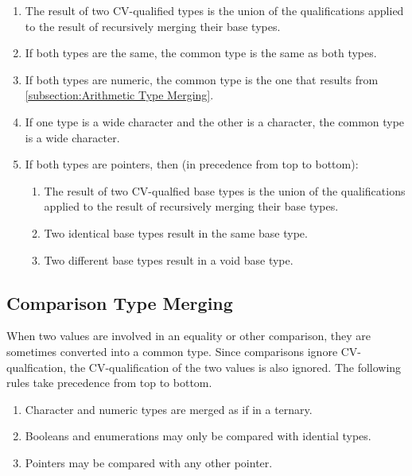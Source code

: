 \documentclass[letterpaper,12pt]{book}
\begin{document}
\begin{enumerate}
	\item The result of two CV-qualified types is the union of the qualifications applied to the result of recursively merging their base types.
	
	\item If both types are the same, the common type is the same as both types.
	
	\item If both types are numeric, the common type is the one that results from \ref{subsection:Arithmetic Type Merging}.
	
	\item If one type is a wide character and the other is a character, the common type is a wide character.
	
	\item If both types are pointers, then (in precedence from top to bottom):
	\begin{enumerate}
		\item The result of two CV-qualfied base types is the union of the qualifications applied to the result of recursively merging their base types.
		
		\item Two identical base types result in the same base type.
		
		\item Two different base types result in a void base type.
	\end{enumerate}
\end{enumerate}

\subsection{Comparison Type Merging}\label{subsection:Comparison Type Merging}

When two values are involved in an equality or other comparison, they are sometimes converted into a common type. Since comparisons ignore CV-qualfication, the CV-qualification of the two values is also ignored. The following rules take precedence from top to bottom.

\begin{enumerate}
	\item Character and numeric types are merged as if in a ternary.
	
	\item Booleans and enumerations may only be compared with idential types.
	
	\item Pointers may be compared with any other pointer.
\end{enumerate}
\end{document}
